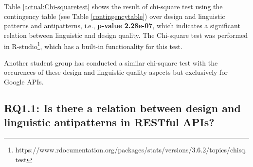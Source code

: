 Table \ref{actual:Chi-squaretest} shows the result of chi-square test using the contingency table (see Table \ref{contingencytable}) over design and linguistic patterns and antipatterns, i.e., \textbf{p-value  2.28e-07}, which indicates a significant relation between linguistic and design quality. The Chi-square test was performed in R-studio\footnote{https://www.rdocumentation.org/packages/stats/versions/3.6.2/topics/chisq.test}, which has a built-in functionality for this test. 

Another student group has conducted a similar chi-square test with the occurences of these design and linguistic quality aspects but exclusively for Google APIs. 

\subsection{RQ1.1: Is there a relation between design and linguistic antipatterns in RESTful APIs?}

